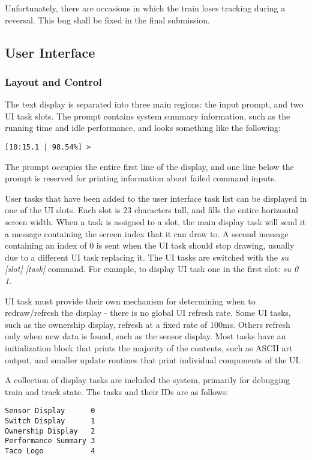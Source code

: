 \documentclass[twoside,a4paper]{refart}
\begin{document}
Unfortunately, there are occasions in which the train loses tracking during a reversal. This bug shall be fixed in the final submission.

\subsection{User Interface}
\subsubsection{Layout and Control}
The text display is separated into three main regions: the input prompt, and two UI task slots. The prompt contains system summary information, such as the running time and idle performance, and looks something like the following:
\begin{verbatim}
[10:15.1 | 98.54%] > 
\end{verbatim}

The prompt occupies the entire first line of the display, and one line below the prompt is reserved for printing information about failed command inputs.

User tasks that have been added to the user interface task list can be displayed in one of the UI slots. Each slot is 23 characters tall, and fills the entire horizontal screen width. When a task is assigned to a slot, the main display task will send it a message containing the screen index that it can draw to. A second message containing an index of 0 is sent when the UI task should stop drawing, usually due to a different UI task replacing it. The UI tasks are switched with the \textit{su [slot] [task]} command. For example, to display UI task one in the first slot: \textit{su 0 1}.

UI task must provide their own mechanism for determining when to redraw/refresh the display - there is no global UI refresh rate. Some UI tasks, such as the ownership display, refresh at a fixed rate of 100ms. Others refresh only when new data is found, such as the sensor display. Most tasks have an initialization block that prints the majority of the contents, such as ASCII art output, and smaller update routines that print individual components of the UI.

A collection of display tasks are included the system, primarily for debugging train and track state. The tasks and their IDs are as follows:
\begin{verbatim}
Sensor Display      0
Switch Display      1
Ownership Display   2
Performance Summary 3
Taco Logo           4
\end{verbatim}
\end{document}
